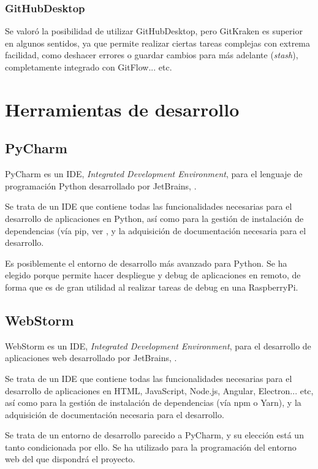 \subsubsection{GitHubDesktop}
Se valoró la posibilidad de utilizar GitHubDesktop, pero GitKraken es superior en algunos sentidos, ya que permite realizar ciertas tareas complejas con extrema facilidad, como deshacer errores o guardar cambios para más adelante (\textit{stash}), completamente integrado con GitFlow... etc.

\section{Herramientas de desarrollo}

\subsection{PyCharm}

PyCharm es un IDE, \textit{Integrated Development Environment}, para el lenguaje de programación Python desarrollado por JetBrains, \citep{wiki:PyCharm}. 

Se trata de un IDE que contiene todas las funcionalidades necesarias para el desarrollo de aplicaciones en Python, así como para la gestión de instalación de dependencias (vía pip, ver \citep{wiki:PyPa}, y la adquisición de documentación necesaria para el desarrollo. 

Es posiblemente el entorno de desarrollo más avanzado para Python. Se ha elegido porque permite hacer despliegue y debug de aplicaciones en remoto, de forma que es de gran utilidad al realizar tareas de debug en una RaspberryPi.


\subsection{WebStorm}

WebStorm es un IDE, \textit{Integrated Development Environment}, para el desarrollo de aplicaciones web desarrollado por JetBrains, \citep{wiki:WebStorm}. 

Se trata de un IDE que contiene todas las funcionalidades necesarias para el desarrollo de aplicaciones en HTML, JavaScript, Node.js, Angular, Electron... etc, así como para la gestión de instalación de dependencias (vía npm o Yarn), y la adquisición de documentación necesaria para el desarrollo. 

Se trata de un entorno de desarrollo parecido a PyCharm, y su elección está un tanto condicionada por ello. Se ha utilizado para la programación del entorno web del que dispondrá el proyecto. 

